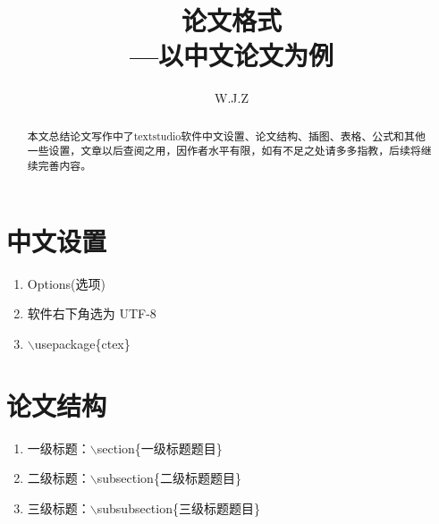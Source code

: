 \documentclass{article}
\title{{论文格式}\\
	{\large ---以中文论文为例}}
\author{W.J.Z}
\date{}
\begin{document}
	
\maketitle
\begin{abstract}
	本文总结论文写作中了textstudio软件中文设置、论文结构、插图、表格、公式和其他一些设置，文章以后查阅之用，因作者水平有限，如有不足之处请多多指教，后续将继续完善内容。
\end{abstract}

\section{中文设置}
	\begin{enumerate}[步骤1:]
		\item Options(选项) 
		\item 软件右下角选为 UTF-8
		\item $\backslash$usepackage\{ctex\}
	\end{enumerate}

\section{论文结构}
	\begin{enumerate}[结构1：]
		\item 	一级标题：$\backslash$section\{一级标题题目\}
		\item   二级标题：$\backslash$subsection\{二级标题题目\}
		\item  三级标题：$\backslash$subsubsection\{三级标题题目\}
	\end{enumerate}
\end{document}

